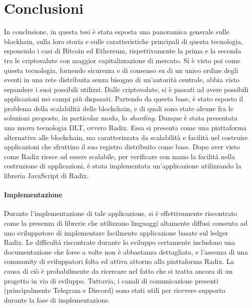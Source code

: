 
\chapter*{Conclusioni}

In conclusione, in questa tesi è stata esposta una panoramica generale sulle blockhain, sulla loro storia e sulle caratteristiche principali di questa tecnologia, esponendo i casi di Bitcoin ed Ethereum, rispettivamente la prima e la seconda tra le criptovalute con maggior capitalizzazione di mercato. Si è visto poi come questa tecnologia, fornendo sicurezza e di consenso su di un unico ordine degli eventi in una rete distribuita senza bisogno di un'autorità centrale, abbia visto espandere i suoi possibili utilizzi. Dalle criptovalute, si è passati ad avere possibili applicazioni nei campi più disparati.
Partendo da questa base, è stato esposto il problema della scalabilità delle blockchain, e di quali sono state alcune fra le soluzioni proposte, in particolar modo, lo \textit{sharding}. Dunque è stata presentata una nuova tecnologia DLT, ovvero Radix. Essa si presenta come una piattaforma alternativa alle blockchain, ma caratterizzata da scalabilità e facilità nel costruire applicazioni che sfruttino il suo registro distribuito come base. Dopo aver visto come Radix riesce ad essere scalabile, per verificare con mano la facilità nella costruzione di applicazioni, è stata implementata un'applicazione utilizzando la libreria JavaScript di Radix. 

\subsubsection{Implementazione}

Durante l'implementazione di tale applicazione, si è effettivamente riscontrato come la presenza di librerie che utilizzano linguaggi altamente diffusi consenta ad uno sviluppatore di implementare facilmente applicazione basate sul ledger Radix. Le difficoltà riscontrate durante lo sviluppo certamente includono una documentazione che forse a volte non è abbastanza dettagliata, e l'assenza di una community di sviluppatori folta ed attiva attorno alla piattaforma Radix. La causa di ciò è probabilmente da ricercare nel fatto che si tratta ancora di un progetto in via di sviluppo. Tuttavia, i canali di comunicazione presenti (principalmente Telegram e Discord) sono stati utili per ricevere supporto durante la fase di implementazione.

